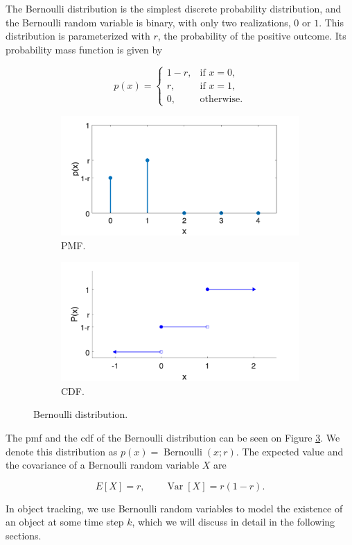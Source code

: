 The Bernoulli distribution is the simplest discrete probability
distribution, and the Bernoulli random variable is binary, with only
two realizations, $0$ or $1$. This distribution is parameterized with 
$r$, the probability of the positive outcome. Its probability mass 
function is given by

\begin{equation}
p(x) = \begin{cases}
 1 - r, & \text{if } x = 0, \\
     r, & \text{if } x = 1, \\
     0, & \text{otherwise}.
\end{cases}
\end{equation}

\begin{figure}
\centering
\begin{subfigure}{.5\textwidth}
  \centering
  \includegraphics[width=.9\linewidth]{figures/bern.pmf.png}
  \caption{PMF.}
  \label{fig:bern:pmf}
\end{subfigure}\hfill
\begin{subfigure}{.5\textwidth}
  \centering
  \includegraphics[width=.9\linewidth]{figures/bern.cdf.png}
  \caption{CDF.}
  \label{fig:bern:cdf}
\end{subfigure}
\caption[An example of the Bernoulli distribution.]{Bernoulli distribution.}
\label{fig:bern}
\end{figure}

The pmf and the cdf of the Bernoulli distribution can be seen on Figure \ref{fig:bern}.
We denote this distribution as $p(x) = \operatorname{Bernoulli}(x;r)$.
The expected value and the covariance of a Bernoulli random variable $X$ are

\begin{equation}
E[X] = r, \qquad \operatorname{Var}[X] = r(1-r).
\end{equation}

In object tracking, we use Bernoulli random variables to model the existence of
an object at some time step $k$, which we will discuss in detail in the following
sections.
